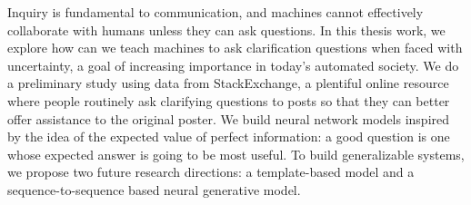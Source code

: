 Inquiry is fundamental to communication, and machines cannot effectively collaborate with humans unless they can ask questions. In this thesis work, we explore how can we teach machines to ask clarification questions when faced with uncertainty, a goal of increasing importance in today's automated society. We do a preliminary study using data from StackExchange, a plentiful online resource where people routinely ask clarifying questions to posts so that they can better offer assistance to the original poster. We build neural network models inspired by the idea of the expected value of perfect information: a good question is one whose expected answer is going to be most useful. To build generalizable systems, we propose two future research directions: a template-based model and a sequence-to-sequence based neural generative model.

